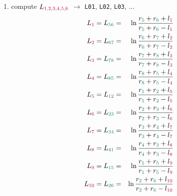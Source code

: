 \begin{enumerate}
\item compute $L_{\color{purple}1,2,3,4,5,6}$ $\rightarrow$ \verb|L01|, \verb|L02|, \verb|L03|, ... 
\begin{eqnarray}
L_{\color{purple}1} = L_{\color{teal}56} 
&=& \ln \frac{r_{\color{teal}5}+r_{\color{teal}6}+l_{\color{purple}1}}
             {r_{\color{teal}5}+r_{\color{teal}6}-l_{\color{purple}1}} 
\nn\\
L_{\color{purple}2} = L_{\color{teal}67} 
&=& \ln \frac{r_{\color{teal}6}+r_{\color{teal}7}+l_{\color{purple}2}}
             {r_{\color{teal}6}+r_{\color{teal}7}-l_{\color{purple}2}} 
\nn\\
L_{\color{purple}3} = L_{\color{teal}78} 
&=& \ln \frac{r_{\color{teal}7}+r_{\color{teal}8}+l_{\color{purple}3}}
             {r_{\color{teal}7}+r_{\color{teal}8}-l_{\color{purple}3}} 
\nn\\
L_{\color{purple}4} = L_{\color{teal}85} 
&=& \ln \frac{r_{\color{teal}8}+r_{\color{teal}5}+l_{\color{purple}4}}
             {r_{\color{teal}8}+r_{\color{teal}5}-l_{\color{purple}4}} 
\nn\\
L_{\color{purple}5} = L_{\color{teal}12} 
&=& \ln \frac{r_{\color{teal}1}+r_{\color{teal}2}+l_{\color{purple}5}}
             {r_{\color{teal}1}+r_{\color{teal}2}-l_{\color{purple}5}} 
\nn\\
L_{\color{purple}6} = L_{\color{teal}23} 
&=& \ln \frac{r_{\color{teal}2}+r_{\color{teal}3}+l_{\color{purple}6}}
             {r_{\color{teal}2}+r_{\color{teal}3}-l_{\color{purple}6}} 
\nn\\
L_{\color{purple}7} = L_{\color{teal}34} 
&=& \ln \frac{r_{\color{teal}3}+r_{\color{teal}4}+l_{\color{purple}7}}
             {r_{\color{teal}3}+r_{\color{teal}4}-l_{\color{purple}7}} 
\nn\\
L_{\color{purple}8} = L_{\color{teal}41} 
&=& \ln \frac{r_{\color{teal}4}+r_{\color{teal}3}+l_{\color{purple}8}}
             {r_{\color{teal}4}+r_{\color{teal}3}-l_{\color{purple}8}} 
\nn\\
L_{\color{purple}9} = L_{\color{teal}15} 
&=& \ln \frac{r_{\color{teal}1}+r_{\color{teal}5}+l_{\color{purple}9}}
             {r_{\color{teal}1}+r_{\color{teal}5}-l_{\color{purple}9}} 
\nn\\
L_{\color{purple}10} = L_{\color{teal}26} 
&=& \ln \frac{r_{\color{teal}2}+r_{\color{teal}6}+l_{\color{purple}10}}
             {r_{\color{teal}2}+r_{\color{teal}6}-l_{\color{purple}10}} 
\nn\\

\end{eqnarray}
\end{enumerate}
